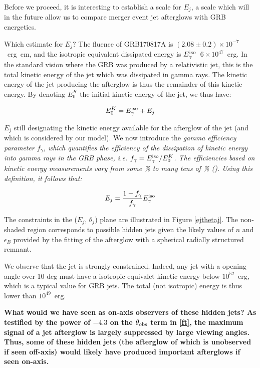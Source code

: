 Before we proceed, it is interesting to establish a scale for $E_j$, a scale which will in the future allow us to compare merger event jet afterglows with GRB energetics.

Which estimate for $E_j$? The fluence of GRB170817A is $(2.08\pm0.2)\times10^{-7}$~erg~cm, and the isotropic equivalent dissipated energy is $E^{\rm{iso}}_\gamma$~$6 \times 10^{47}$~erg. In the standard vision where the GRB was produced by a relativistic jet, this is the total kinetic energy of the jet which was dissipated in gamma rays. The kinetic energy of the jet producing the afterglow is thus the remainder of this kinetic energy. By denoting $E^K_0$ the initial kinetic energy of the jet, we thus have:

$$E^K_0 = E^{\rm{iso}}_\gamma + E_j$$

$E_j$ still designating the kinetic energy available for the afterglow of the jet (and which is considered by our model). We now introduce the \it{gamma efficiency} parameter $f_\gamma$, which quantifies the efficiency of the dissipation of kinetic energy into gamma rays in the GRB phase, i.e. $f_\gamma = E^{\rm{iso}}_\gamma/E^K_0$. The efficiencies based on kinetic energy measurements vary from some \% to many tens of \% (\cite{47,48}). Using this definition, it follows that:

$$E_j = \frac{1 - f_\gamma}{f_\gamma} E^{\rm{iso}}_\gamma $$

The constraints in the ($E_j$, $\theta_j$) plane are illustrated in Figure \ref{ejthetaj}. The non-shaded region corresponds to possible hidden jets given the likely values of $n$ and $\epsilon_B$ provided by the fitting of the afterglow with a spherical radially structured remnant.


We observe that the jet is strongly constrained. Indeed, any jet with a opening angle over 10 deg must have a isotropic-equivalet kinetic energy below $10^{52}$~erg, which is a typical value for GRB jets. The total (not isotropic) energy is thus lower than $10^49$~erg.

\bf{What would we have seen as on-axis observers of these hidden jets?} As testified by the power of $-4.3$ on the $\thetaobs$ term in \ref{ft}, the maximum signal of a jet afterglow is largely suppressed by large viewing angles. Thus, some of these hidden jets (the afterglow of which is unobserved if seen off-axis) would likely have produced important afterglows if seen on-axis.

